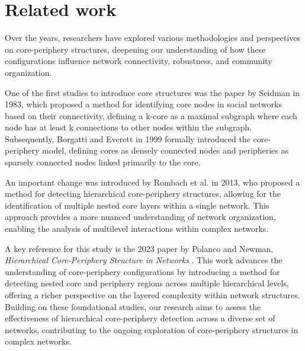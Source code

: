 \documentclass[sigconf]{acmart}
\begin{document}

\section{Related work}
Over the years, researchers have explored various methodologies and perspectives on core-periphery structures, deepening our understanding of how these configurations influence network connectivity, robustness, and community organization.

One of the first studies to introduce core structures was the paper by Seidman \cite{seidman} in 1983, which proposed a method for identifying core nodes in social networks based on their connectivity, defining a k-core as a maximal subgraph where each node has at least k connections to other nodes within the subgraph. 
Subsequently, Borgatti and Everett \cite{borgatti} in 1999 formally introduced the core-periphery model, defining cores as densely connected nodes and peripheries as sparsely connected nodes linked primarily to the core. 

An important change was introduced by Rombach et al. \cite{rombach} in 2013, who proposed a method for detecting hierarchical core-periphery structures, allowing for the identification of multiple nested core layers within a single network. This approach provides a more nuanced understanding of network organization, enabling the analysis of multilevel interactions within complex networks.

A key reference for this study is the 2023 paper by Polanco and Newman, \textit{Hierarchical Core-Periphery Structure in Networks} \cite{hierarchical}. This work advances the understanding of core-periphery configurations by introducing a method for detecting nested core and periphery regions across multiple hierarchical levels, offering a richer perspective on the layered complexity within network structures. \\
Building on these foundational studies, our research aims to assess the effectiveness of hierarchical core-periphery detection across a diverse set of networks, contributing to the ongoing exploration of core-periphery structures in complex networks.
\end{document}
